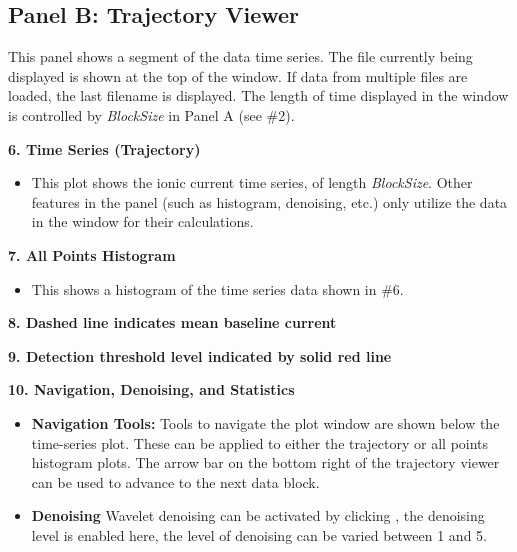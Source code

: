 \documentclass[letterpaper,10pt,english]{sphinxmanual}
\begin{document}
\subsection{Panel B: Trajectory Viewer}
\label{doc/GraphicalInterface:trajectory-viewer}\label{doc/GraphicalInterface:panel-b-trajectory-viewer}
This panel shows a segment of the data time series. The file currently being displayed is shown at the top of the window. If data from multiple files are loaded, the last filename is displayed. The length of time displayed in the window is controlled by \emph{BlockSize} in Panel A (see \#2).

\textbf{6.  Time Series (Trajectory)}
\begin{itemize}
\item {} 
This plot shows the ionic current time series, of length \emph{BlockSize}. Other features in the panel (such as histogram, denoising, etc.) only utilize the data in the window for their calculations.

\end{itemize}

\textbf{7.  All Points Histogram}
\begin{itemize}
\item {} 
This shows a histogram of the time series data shown in \#6.

\end{itemize}

\textbf{8. Dashed line indicates mean baseline current}

\textbf{9. Detection threshold level indicated by solid red line}

\textbf{10. Navigation, Denoising, and Statistics}
\begin{itemize}
\item {} 
\textbf{Navigation Tools:} Tools to navigate the plot window are shown below the time-series plot. These can be applied to either the trajectory or all points histogram plots. The arrow bar on the bottom right of the trajectory viewer can be used to advance to the next data block.

\item {} 
\textbf{Denoising} Wavelet denoising can be activated by clicking , the denoising level is enabled here, the level of denoising can be varied between 1 and 5.

\end{itemize}
\end{document}
